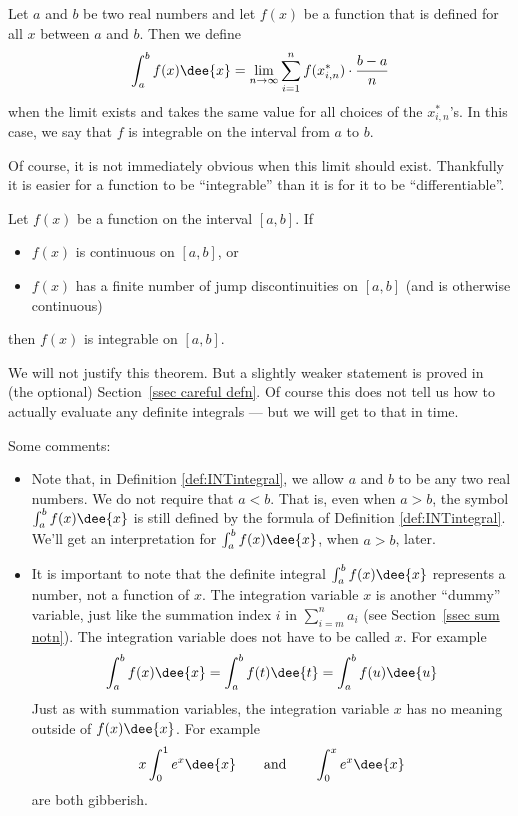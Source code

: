\begin{defn}\label{def:INTintegral}
Let $a$ and $b$ be two real numbers and let $f(x)$ be a function that
is defined for all $x$ between $a$ and $b$. Then we define
\begin{align*}
\int_a^b f(x)\dee{x}
=\lim_{n\rightarrow\infty}\sum_{i=1}^n f(x_{i,n}^*)\cdot\frac{b-a}{n}
\end{align*}
when the limit exists and takes the same value for all choices of
the $x_{i,n}^*$'s. In this case, we say that $f$ is integrable on the
interval from $a$ to $b$.
\end{defn}
Of course, it is not immediately obvious when this limit should exist. Thankfully it is
easier for a function to be ``integrable'' than it is for it to be ``differentiable''.
\begin{theorem}\label{thm:integrable}
 Let $f(x)$ be a function on the interval $[a,b]$. If
\begin{itemize}
 \item $f(x)$ is continuous on $[a,b]$, or
 \item $f(x)$ has a finite number of jump discontinuities on $[a,b]$ (and is otherwise
continuous)
\end{itemize}
then $f(x)$ is integrable on $[a,b]$.
\end{theorem}
We will not justify this theorem. But a slightly weaker statement is proved
in (the optional) Section~\ref{ssec careful defn}. Of course this does not tell us how to
actually evaluate any definite integrals --- but we will get to that in time.

Some comments:
\begin{itemize}
 \item Note that, in Definition \ref{def:INTintegral}, we allow $a$ and $b$ to
be any two real numbers. We do not require that $a<b$. That is, even when
$a>b$, the symbol $\int_a^b f(x)\dee{x}$ is still defined by the formula
of Definition \ref{def:INTintegral}. We'll get an interpretation for
$\int_a^b f(x)\dee{x}$, when $a>b$, later.

\item It is important to note that the definite integral $\int_a^b f(x)\dee{x}$
represents a number, not a function of $x$. The integration variable $x$
is another ``dummy'' variable, just like the summation index $i$ in
$\sum_{i=m}^n a_i$ (see Section~\ref{ssec sum notn}). The integration variable does not
have to be called $x$.
For example
\begin{align*}
\int_a^b f(x)\dee{x} = \int_a^b f(t)\dee{t} = \int_a^b f(u)\dee{u}
\end{align*}
Just as with summation variables, the integration variable $x$
has no meaning outside of $f(x)\dee{x}$. For example
\begin{align*}
x\int_0^1 e^x\dee{x}\qquad\text{and}\qquad  \int_0^x e^x\dee{x}
\end{align*}
are both gibberish.
\end{itemize}

